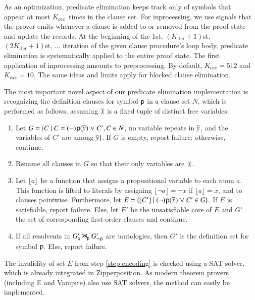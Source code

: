 As an optimization, predicate elimination keeps track only of symbols that appear
at most $K_\mathrm{occ}$~times in the clause set. For inprocessing, we use
signals that the prover emits whenever a clause is added to or removed from
the proof state and update the records. At the beginning of the
1st, $(K_\mathrm{iter} + 1)$st, $(2 K_\mathrm{iter} + 1)$st, $\dots{}$ iteration of the given clause procedure's
loop body, predicate elimination is systematically applied to the entire proof
state. The first application of inprocessing amounts to preprocessing. By
default, $K_\mathrm{occ} = 512$ and $K_\mathrm{iter}=10$. The same ideas and
limits apply for blocked clause elimination.

The most important novel aspect of our predicate elimination implementation is
recognizing the definition clauses for symbol $\mathsf{p}$ in a clause set $N$, which is performed
as follows, assuming $\overline{x}_{}$ is a fixed tuple of distinct free variables:
\begin{enumerate}
   \item Let $G = \{ C \mid C = (\neg)\kern.2ex{\mathsf{p}(\overline{y}_{})} \mathrel{\lor} C', C \in
   N$, no variable repeats in $\overline{y}_{}$, and the variables of $C'$ are among
   $\overline{y}_{}\}$. If $G$ is empty, report failure; otherwise, continue.

   \item Rename all clauses in $G$ so that their only variables are~$\overline{x}_{}$.

   \item\label{step:encoding} Let $\lfloor a \rfloor$ be a function that assigns
   a propositional variable to each atom $a$. This function is lifted to
   literals by assigning $\lfloor \neg a \rfloor  = \neg x$ if $\lfloor a
   \rfloor = x$, and to clauses pointwise. Furthermore,  
   let $E = \{ \lfloor C' \rfloor \mid
   (\neg)\kern.2ex{\mathsf{p}(\overline{x}_{})} \mathrel{\lor} C' \in G \}$. If $E$ is satisfiable,
   report failure. Else, let $E'$ be the unsatisfiable core of $E$
   and $G'$ the set of corresponding first-order clauses and continue.

   \item If all resolvents in $G'_{{\mathsf{p}}} \mathbin{\smash{\hbox{\Large$\kern-.1ex\rtimes$}}}_{\!\mathsf{p}}
   G'_{\neg{\kern.2ex \mathsf{p}}}$ are tautologies, then $G'$ is the definition set
   for symbol $\mathsf{p}$. Else, report failure.
\end{enumerate}

The invalidity of set $E$ from step \ref{step:encoding} is checked using a SAT
solver, which is already integrated in Zipperposition. As modern theorem provers
(including E and Vampire) also use SAT solvers, the method can easily be
implemented.

